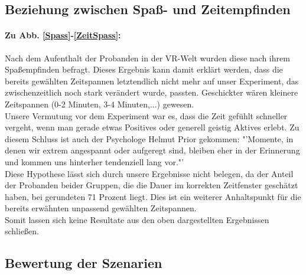 \documentclass{Paper}
\begin{document}
\subsection{Beziehung zwischen Spaß- und Zeitempfinden}
\paragraph{Zu Abb. \ref{Spass}-\ref{ZeitSpass}:} Nach dem Aufenthalt der Probanden in der VR-Welt wurden diese nach ihrem Spaßempfinden befragt. Dieses Ergebnis kann damit erklärt werden, dass die bereits gewählten Zeitspannen letztendlich nicht mehr auf unser Experiment, das zwischenzeitlich noch stark verändert wurde, passten. Geschickter wären kleinere Zeitspannen (0-2 Minuten, 3-4 Minuten,...) gewesen.\\
Unsere Vermutung vor dem Experiment war es, dass die Zeit gefühlt schneller vergeht, wenn man gerade etwas Positives oder generell geistig Aktives erlebt. Zu diesem Schluss ist auch der Psychologe Helmut Prior gekommen: "'Momente, in denen wir extrem angespannt oder aufgeregt sind, bleiben eher in der Erinnerung und kommen uns hinterher tendenziell lang vor."' \cite{Irle2017} \\
Diese Hypothese lässt sich durch unsere Ergebnisse nicht belegen, da der Anteil der Probanden beider Gruppen, die die Dauer im korrekten Zeitfenster geschätzt haben, bei gerundeten 71 Prozent liegt. Dies ist ein weiterer Anhaltspunkt für die bereits erwähnten unpassend gewählten Zeitspannen.\\
Somit lassen sich keine Resultate aus den oben dargestellten Ergebnissen schließen.

\subsection{Bewertung der Szenarien}
\end{document}
